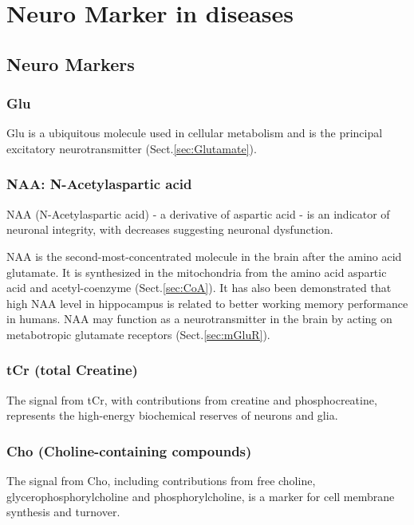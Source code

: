\chapter{Neuro Marker in diseases}
\label{chap:neuro-marker}




\section{Neuro Markers}

\subsection{Glu}

Glu is a ubiquitous molecule used in cellular metabolism and is the principal
excitatory neurotransmitter (Sect.\ref{sec:Glutamate}).

\subsection{NAA: N-Acetylaspartic acid}
\label{sec:NAA}

NAA (N-Acetylaspartic acid) - a derivative of aspartic acid - is an indicator of
neuronal integrity, with decreases suggesting neuronal dysfunction. 

NAA is the second-most-concentrated molecule in the brain after the amino acid
glutamate. It is synthesized in the mitochondria from the amino acid aspartic
acid and acetyl-coenzyme (Sect.\ref{sec:CoA}). It has also been demonstrated
that high NAA level in hippocampus is related to better working memory
performance in humans. NAA may function as a neurotransmitter in the brain by
acting on metabotropic glutamate receptors (Sect.\ref{sec:mGluR}).

\subsection{tCr (total Creatine)}
\label{sec:tCr}

The signal from tCr, with contributions from creatine and phosphocreatine,
represents the high-energy biochemical reserves of neurons and glia. 

\subsection{Cho (Choline-containing compounds)}
\label{sec:Cho}

The signal from Cho, including contributions from free choline,
glycerophosphorylcholine and phosphorylcholine, is a marker for cell
membrane synthesis and turnover. 

